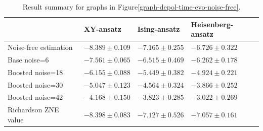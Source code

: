 \begin{table}[h]
\caption{Result summary for graphs in Figure\ref{graph-depol-time-evo-noise-free}.}
\begin{tabular}{@{}llll@{}}
\toprule
  & XY-ansatz  & Ising-ansatz  & Heisenberg-ansatz\\
\midrule
Noise-free estimation & $-8.389 \pm 0.109$ & $-7.165 \pm 0.255$ & $-6.726 \pm 0.322$ \\
\midrule
Base noise=6 & $-7.561 \pm 0.065$ & $-6.515 \pm 0.469$ & $-6.262 \pm 0.178$ \\
Boosted noise=18 & $-6.155 \pm 0.088$ & $-5.449 \pm 0.382$ & $-4.924 \pm 0.221$ \\
Boosted noise=30 & $-5.047 \pm 0.123$ & $-4.564 \pm 0.324$ & $-3.866 \pm 0.252$ \\
Boosted noise=42 & $-4.168 \pm 0.150$ & $-3.823 \pm 0.285$ & $-3.022 \pm 0.269$ \\
\midrule
Richardson ZNE value & $-8.398 \pm 0.083$ & $-7.127 \pm 0.526$ & $-7.057 \pm 0.161$ \\
\bottomrule
\end{tabular}
\label{table-depol-noise-free-time-evo}
\end{table}
